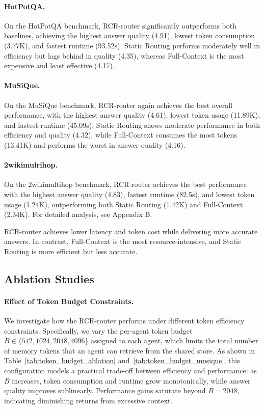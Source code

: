 \documentclass[letterpaper]{article} %
\begin{document}
\paragraph{HotPotQA.}
On the HotPotQA benchmark, RCR-router significantly outperforms both baselines, achieving the highest answer quality (4.91), lowest token consumption (3.77K), and fastest runtime (93.52s). Static Routing performs moderately well in efficiency but lags behind in quality (4.35), whereas Full-Context is the most expensive and least effective (4.17).

\paragraph{MuSiQue.}
On the MuSiQue benchmark, RCR-router again achieves the best overall performance, with the highest answer quality (4.61), lowest token usage (11.89K), and fastest runtime (45.09s). Static Routing shows moderate performance in both efficiency and quality (4.32), while Full-Context consumes the most tokens (13.41K) and performs the worst in answer quality (4.16).

\paragraph{2wikimulrihop.}
On the 2wikimultihop benchmark, RCR-router achieves the best performance with the highest answer quality (4.83), fastest runtime (82.5s), and lowest token usage (1.24K), outperforming both Static Routing (1.42K) and Full-Context (2.34K).
 For detailed analysis, see Appendix B. %


RCR-router achieves lower latency and token cost while delivering more accurate answers. In contrast, Full-Context is the most resource-intensive, and Static Routing is more efficient but less accurate.

\subsection{Ablation Studies}
\paragraph{Effect of Token Budget Constraints.}
We investigate how the RCR-router performs under different token efficiency constraints. Specifically, we vary the per-agent token budget $B \in \{512, 1024, 2048, 4096\}$ assigned to each agent, which limits the total number of memory tokens that an agent can retrieve from the shared store. As shown in Table~\ref{tab:token_budget_ablation} and~\ref{tab:token_budget_musique}, this configuration models a practical trade-off between efficiency and performance: as $B$ increases, token consumption and runtime grow monotonically, while answer quality improves sublinearly. Performance gains saturate beyond $B{=}2048$, indicating diminishing returns from excessive context.
\end{document}
